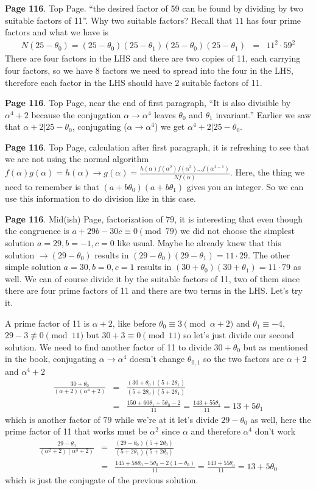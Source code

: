 \documentclass[aps,preprint,preprintnumbers,nofootinbib,showpacs,prd]{revtex4-1}
\newcommand{\nbea}{\begin{eqnarray*}}
\newcommand{\neea}{\end{eqnarray*}}
\begin{document}
{\bf Page 116}. Top Page. ``the desired factor of 59 can be found by dividing by two suitable factors of 11''. Why two suitable factors? Recall that $11$ has four prime factors and what we have is
%
\nbea
N(25 - \theta_0) = (25 - \theta_0)(25 - \theta_1)(25 - \theta_0)(25 - \theta_1) & = & 11^2 \cdot 59^2
\neea
%
There are four factors in the LHS and there are two copies of 11, each carrying four factors, so we have 8 factors we need to spread into the four in the LHS, therefore each factor in the LHS should have 2 suitable factors of 11.

{\bf Page 116}. Top Page, near the end of first paragraph, ``It is also divisible by $\alpha^4 + 2$ because the conjugation $\alpha\to\alpha^4$ leaves $\theta_0$ and $\theta_1$ invariant.'' Earlier we saw that $\alpha + 2|25 - \theta_0$, conjugating ($\alpha \to \alpha^4$) we get $\alpha^4 + 2|25 - \theta_0$.

{\bf Page 116}. Top Page, calculation after first paragraph, it is refreshing to see that we are not using the normal algorithm $f(\alpha) g(\alpha) = h(\alpha) \to g(\alpha) = \frac{h(\alpha)f(\alpha^2)f(\alpha^3) \dots f(\alpha^{\lambda - 1})}{Nf(\alpha)}$. Here, the thing we need to remember is that $(a + b\theta_0)(a + b\theta_1)$ gives you an integer. So we can use this information to do division like in this case.

{\bf Page 116}. Mid(ish) Page, factorization of 79, it is interesting that even though the congruence is $a + 29b - 30c \equiv 0 \pmod{79}$ we did not choose the simplest solution $a = 29, b=-1, c=0$ like usual. Maybe he already knew that this solution $\to (29 - \theta_0)$ results in $(29 - \theta_0)(29 - \theta_1) = 11 \cdot 29$. The other simple solution $a = 30, b = 0, c = 1$ results in $(30 + \theta_0)(30 + \theta_1) = 11 \cdot 79$ as well. We can of course divide it by the suitable factors of 11, two of them since there are four prime factors of 11 and there are two terms in the LHS. Let's try it.

A prime factor of 11 is $\alpha + 2$, like before $\theta_0 \equiv 3 \pmod{\alpha + 2}$ and $\theta_1 \equiv -4$, $29 - 3 \not \equiv 0 \pmod{11}$ but $30 + 3 \equiv 0 \pmod{11}$ so let's just divide our second solution. We need to find another factor of 11 to divide $30 + \theta_0$ but as mentioned in the book, conjugating $\alpha \to \alpha^4$ doesn't change $\theta_{0,1}$ so the two factors are $\alpha + 2$ and $\alpha^4 + 2$
%
\nbea
\frac{30 + \theta_0}{(\alpha + 2)(\alpha^4 + 2)} & = & \frac{(30 + \theta_0)(5 + 2\theta_1)}{(5 + 2\theta_0)(5 + 2\theta_1)} \\
& = & \frac{150 + 60\theta_1 + 5\theta_0 - 2}{11} = \frac{143 + 55\theta_1}{11} = 13 + 5\theta_1
\neea
%
which is another factor of $79$ while we're at it let's divide $29 - \theta_0$ as well, here the prime factor of 11 that works must be $\alpha^2$ since $\alpha$ and therefore $\alpha^4$ don't work
%
\nbea
\frac{29 - \theta_0}{(\alpha^2 + 2)(\alpha^3 + 2)} & = & \frac{(29 - \theta_0)(5 + 2\theta_0)}{(5 + 2\theta_1)(5 + 2\theta_0)} \\
& = & \frac{145 + 58\theta_0 - 5\theta_0 - 2(1 - \theta_0)}{11} = \frac{143 + 55\theta_0}{11} = 13 + 5\theta_0
\neea
%
which is just the conjugate of the previous solution.
\end{document}
